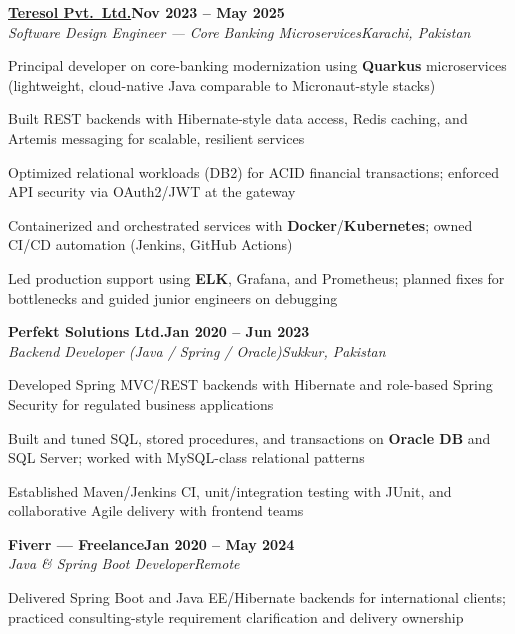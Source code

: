 \documentclass[letterpaper,10pt]{article}
\newcommand{\heading}[2]{
  \hspace{8pt}#1\hfill#2\\
}
\newcommand{\headingBf}[2]{
  \heading{\textbf{#1}}{\textbf{#2}}
}
\newcommand{\headingIt}[2]{
  \heading{\textit{#1}}{\textit{#2}}
}
\newenvironment{resume_list}{
  \vspace{-6pt}
  \begin{itemize}[itemsep=-1px, parsep=0.5pt, topsep=1pt, leftmargin=22pt]
}{
  \end{itemize}
  \vspace{-2pt}
}
\begin{document}
\vspace{2pt}
\headingBf{\href{https://teresol.com/}{Teresol Pvt.\ Ltd.}}{Nov 2023 -- May 2025}
\headingIt{Software Design Engineer --- Core Banking Microservices}{Karachi, Pakistan}
\begin{resume_list}
  \item Principal developer on core-banking modernization using \textbf{Quarkus} microservices (lightweight, cloud-native Java comparable to Micronaut-style stacks)
  \item Built REST backends with Hibernate-style data access, Redis caching, and Artemis messaging for scalable, resilient services
  \item Optimized relational workloads (DB2) for ACID financial transactions; enforced API security via OAuth2/JWT at the gateway
  \item Containerized and orchestrated services with \textbf{Docker}/\textbf{Kubernetes}; owned CI/CD automation (Jenkins, GitHub Actions)
  \item Led production support using \textbf{ELK}, Grafana, and Prometheus; planned fixes for bottlenecks and guided junior engineers on debugging
\end{resume_list}

\vspace{2pt}
\headingBf{Perfekt Solutions Ltd.}{Jan 2020 -- Jun 2023}
\headingIt{Backend Developer (Java / Spring / Oracle)}{Sukkur, Pakistan}
\begin{resume_list}
  \item Developed Spring MVC/REST backends with Hibernate and role-based Spring Security for regulated business applications
  \item Built and tuned SQL, stored procedures, and transactions on \textbf{Oracle DB} and SQL Server; worked with MySQL-class relational patterns
  \item Established Maven/Jenkins CI, unit/integration testing with JUnit, and collaborative Agile delivery with frontend teams
\end{resume_list}

\vspace{2pt}
\headingBf{Fiverr --- Freelance}{Jan 2020 -- May 2024}
\headingIt{Java \& Spring Boot Developer}{Remote}
\begin{resume_list}
  \item Delivered Spring Boot and Java EE/Hibernate backends for international clients; practiced consulting-style requirement clarification and delivery ownership
\end{resume_list}
\end{document}
